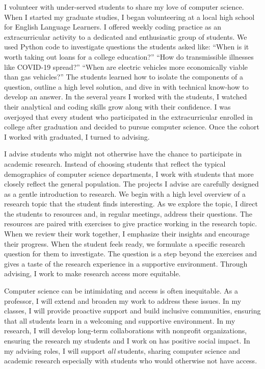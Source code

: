 \documentclass[11pt]{article}
\begin{document}
I volunteer with under-served students to share my love of computer science. When I started my graduate studies, I began volunteering at a local high school for English Language Learners. I offered weekly coding practice as an extracurricular activity to a dedicated and enthusiastic group of students. We used Python code to investigate questions the students asked like:  ``When is it worth taking out loans for a college education?'' ``How do transmissible illnesses like COVID-19 spread?'' ``When are electric vehicles more economically viable than gas vehicles?'' The students learned how to isolate the components of a question, outline a high level solution, and dive in with technical know-how to develop an answer. In the several years I worked with the students, I watched their analytical and coding skills grow along with their confidence. I was overjoyed that every student who participated in the extracurricular enrolled in college after graduation and decided to pursue computer science. Once the cohort I worked with graduated, I turned to advising.

I advise students who might not otherwise have the chance to participate in academic research. Instead of choosing students that reflect the typical demographics of computer science departments, I work with students that more closely reflect the general population. The projects I advise are carefully designed as a gentle introduction to research. We begin with a high level overview of a research topic that the student finds interesting. As we explore the topic, I direct the students to resources and, in regular meetings, address their questions. The resources are paired with exercises to give practice working in the research topic. When we review their work together, I emphasize their insights and encourage their progress. When the student feels ready, we formulate a specific research question for them to investigate. The question is a step beyond the exercises and gives a taste of the research experience in a supportive environment. Through advising, I work to make research access more equitable.

Computer science can be intimidating and access is often inequitable. As a professor, I will extend and broaden my work to address these issues. In my classes, I will provide proactive support and build inclusive communities, ensuring that all students learn in a welcoming and supportive environment. In my research, I will develop long-term collaborations with nonprofit organizations, ensuring the research my students and I work on has positive social impact. In my advising roles, I will support \textit{all} students, sharing computer science and academic research especially with students who would otherwise not have access.



\end{document}
